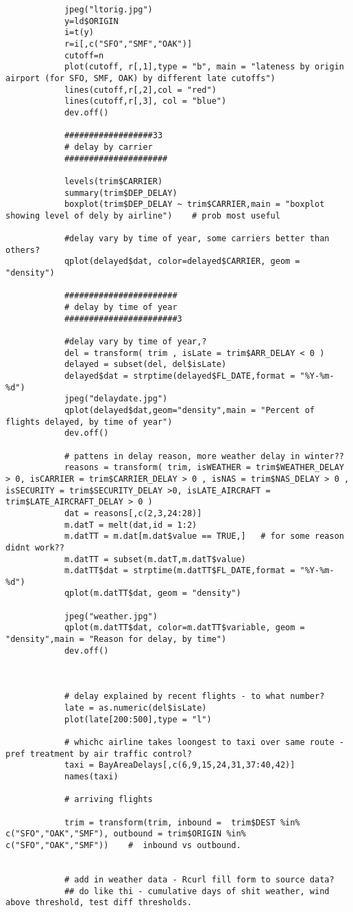 \documentclass[12pt]{article}
\begin{document}
\begin{verbatim}
			jpeg("ltorig.jpg")
			y=ld$ORIGIN
			i=t(y)
			r=i[,c("SFO","SMF","OAK")]
			cutoff=n
			plot(cutoff, r[,1],type = "b", main = "lateness by origin airport (for SFO, SMF, OAK) by different late cutoffs")
			lines(cutoff,r[,2],col = "red")
			lines(cutoff,r[,3], col = "blue")
			dev.off()

			##################33
			# delay by carrier
			#####################

			levels(trim$CARRIER)
			summary(trim$DEP_DELAY)
			boxplot(trim$DEP_DELAY ~ trim$CARRIER,main = "boxplot showing level of dely by airline")	# prob most useful

			#delay vary by time of year, some carriers better than others?
			qplot(delayed$dat, color=delayed$CARRIER, geom = "density")

			#######################
			# delay by time of year
			#######################3

			#delay vary by time of year,?
			del = transform( trim , isLate = trim$ARR_DELAY < 0 )
			delayed = subset(del, del$isLate)
			delayed$dat = strptime(delayed$FL_DATE,format = "%Y-%m-%d")
			jpeg("delaydate.jpg")
			qplot(delayed$dat,geom="density",main = "Percent of flights delayed, by time of year")
			dev.off()

			# pattens in delay reason, more weather delay in winter??
			reasons = transform( trim, isWEATHER = trim$WEATHER_DELAY > 0, isCARRIER = trim$CARRIER_DELAY > 0 , isNAS = trim$NAS_DELAY > 0 , isSECURITY = trim$SECURITY_DELAY >0, isLATE_AIRCRAFT = trim$LATE_AIRCRAFT_DELAY > 0 )
			dat = reasons[,c(2,3,24:28)]
			m.datT = melt(dat,id = 1:2)
			m.datTT = m.dat[m.dat$value == TRUE,]	# for some reason didnt work??
			m.datTT = subset(m.datT,m.datT$value)
			m.datTT$dat = strptime(m.datTT$FL_DATE,format = "%Y-%m-%d")
			qplot(m.datTT$dat, geom = "density")

			jpeg("weather.jpg")
			qplot(m.datTT$dat, color=m.datTT$variable, geom = "density",main = "Reason for delay, by time")
			dev.off()



			# delay explained by recent flights - to what number?
			late = as.numeric(del$isLate)
			plot(late[200:500],type = "l")

			# whichc airline takes loongest to taxi over same route - pref treatment by air traffic control?
			taxi = BayAreaDelays[,c(6,9,15,24,31,37:40,42)]
			names(taxi)

			# arriving flights

			trim = transform(trim, inbound =  trim$DEST %in% c("SFO","OAK","SMF"), outbound = trim$ORIGIN %in% c("SFO","OAK","SMF"))	#  inbound vs outbound.


			# add in weather data - Rcurl fill form to source data?
			## do like thi - cumulative days of shit weather, wind above threshold, test diff thresholds.
		\end{verbatim}
\end{document}
